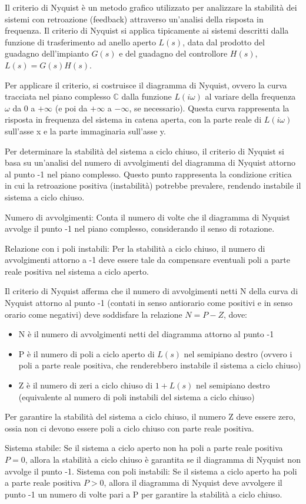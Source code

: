 Il criterio di Nyquist è un metodo grafico utilizzato per analizzare la stabilità dei sistemi con retroazione (feedback) attraverso un'analisi della risposta in frequenza.
Il criterio di Nyquist si applica tipicamente ai sistemi descritti dalla funzione di trasferimento ad anello aperto \(L(s)\), data dal prodotto del guadagno dell'impianto \(G(s)\) e del guadagno del controllore \(H(s)\), \(L(s)=G(s)H(s)\).

Per applicare il criterio, si costruisce il diagramma di Nyquist, ovvero la curva tracciata nel piano complesso \(\mathbb{C}\) dalla funzione \(L(i\omega)\) al variare della frequenza \(\omega\) da 0 a \(+\infty\) (e poi da \(+\infty\) a \(-\infty\), se necessario). Questa curva rappresenta la risposta in frequenza del sistema in catena aperta, con la parte reale di \(L(i\omega)\) sull'asse x e la parte immaginaria sull'asse y.

Per determinare la stabilità del sistema a ciclo chiuso, il criterio di Nyquist si basa su un'analisi del numero di avvolgimenti del diagramma di Nyquist attorno al punto -1 nel piano complesso. Questo punto rappresenta la condizione critica in cui la retroazione positiva (instabilità) potrebbe prevalere, rendendo instabile il sistema a ciclo chiuso.

Numero di avvolgimenti: Conta il numero di volte che il diagramma di Nyquist avvolge il punto -1 nel piano complesso, considerando il senso di rotazione.

Relazione con i poli instabili: Per la stabilità a ciclo chiuso, il numero di avvolgimenti attorno a -1 deve essere tale da compensare eventuali poli a parte reale positiva nel sistema a ciclo aperto.

Il criterio di Nyquist afferma che il numero di avvolgimenti netti N della curva di Nyquist attorno al punto -1 (contati in senso antiorario come positivi e in senso orario come negativi) deve soddisfare la relazione \(N=P-Z\), dove: 
\begin{itemize}
    \item N è il numero di avvolgimenti netti del diagramma attorno al punto -1
    \item P è il numero di poli a ciclo aperto di \(L(s)\) nel semipiano destro (ovvero i poli a parte reale positiva, che renderebbero instabile il sistema a ciclo chiuso)
    \item Z è il numero di zeri a ciclo chiuso di \(1+L(s)\) nel semipiano destro (equivalente al numero di poli instabili del sistema a ciclo chiuso)
\end{itemize}
Per garantire la stabilità del sistema a ciclo chiuso, il numero Z deve essere zero, ossia non ci devono essere poli a ciclo chiuso con parte reale positiva.

Sistema stabile: Se il sistema a ciclo aperto non ha poli a parte reale positiva \(P=0\), allora la stabilità a ciclo chiuso è garantita se il diagramma di Nyquist non avvolge il punto -1.
Sistema con poli instabili: Se il sistema a ciclo aperto ha poli a parte reale positiva \(P>0\), allora il diagramma di Nyquist deve avvolgere il punto -1 un numero di volte pari a P per garantire la stabilità a ciclo chiuso.